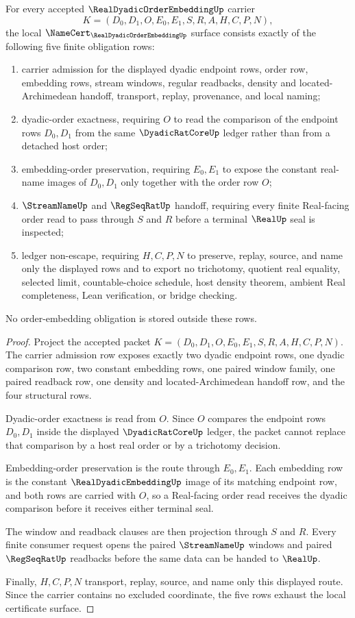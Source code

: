 \begin{theorem}
\label{thm:real-dyadic-order-embedding-namecert-obligations}
For every accepted $\RealDyadicOrderEmbeddingUp$ carrier
$$
K=(D_0,D_1,O,E_0,E_1,S,R,A,H,C,P,N),
$$
the local $\NameCert_{\RealDyadicOrderEmbeddingUp}$ surface consists exactly of the following five finite obligation rows:
\begin{enumerate}
\item carrier admission for the displayed dyadic endpoint rows, order row, embedding rows, stream windows, regular readbacks, density and located-Archimedean handoff, transport, replay, provenance, and local naming;
\item dyadic-order exactness, requiring $O$ to read the comparison of the endpoint rows $D_0,D_1$ from the same $\DyadicRatCoreUp$ ledger rather than from a detached host order;
\item embedding-order preservation, requiring $E_0,E_1$ to expose the constant real-name images of $D_0,D_1$ only together with the order row $O$;
\item $\StreamNameUp$ and $\RegSeqRatUp$ handoff, requiring every finite Real-facing order read to pass through $S$ and $R$ before a terminal $\RealUp$ seal is inspected;
\item ledger non-escape, requiring $H,C,P,N$ to preserve, replay, source, and name only the displayed rows and to export no trichotomy, quotient real equality, selected limit, countable-choice schedule, host density theorem, ambient Real completeness, Lean verification, or bridge checking.
\end{enumerate}
No order-embedding obligation is stored outside these rows.
\end{theorem}
\begin{proof}
Project the accepted packet $K=(D_0,D_1,O,E_0,E_1,S,R,A,H,C,P,N)$. The carrier admission row exposes exactly two dyadic endpoint rows, one dyadic comparison row, two constant embedding rows, one paired window family, one paired readback row, one density and located-Archimedean handoff row, and the four structural rows.

Dyadic-order exactness is read from $O$. Since $O$ compares the endpoint rows $D_0,D_1$ inside the displayed $\DyadicRatCoreUp$ ledger, the packet cannot replace that comparison by a host real order or by a trichotomy decision.

Embedding-order preservation is the route through $E_0,E_1$. Each embedding row is the constant $\RealDyadicEmbeddingUp$ image of its matching endpoint row, and both rows are carried with $O$, so a Real-facing order read receives the dyadic comparison before it receives either terminal seal.

The window and readback clauses are then projection through $S$ and $R$. Every finite consumer request opens the paired $\StreamNameUp$ windows and paired $\RegSeqRatUp$ readbacks before the same data can be handed to $\RealUp$.

Finally, $H,C,P,N$ transport, replay, source, and name only this displayed route. Since the carrier contains no excluded coordinate, the five rows exhaust the local certificate surface.
\end{proof}

